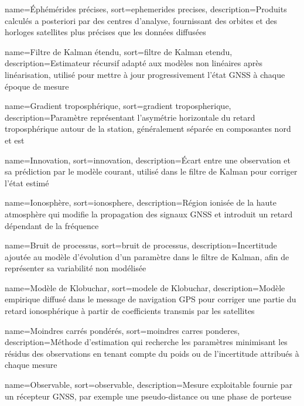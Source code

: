 {
    name={Éphémérides précises},
    sort={ephemerides precises},
    description={Produits calculés a posteriori par des centres d'analyse, fournissant des orbites et des horloges satellites plus précises que les données diffusées}
}

{
    name={Filtre de Kalman étendu},
    sort={filtre de Kalman etendu},
    description={Estimateur récursif adapté aux modèles non linéaires après linéarisation, utilisé pour mettre à jour progressivement l'état GNSS à chaque époque de mesure}
}

{
    name={Gradient troposphérique},
    sort={gradient tropospherique},
    description={Paramètre représentant l'asymétrie horizontale du retard troposphérique autour de la station, généralement séparée en composantes nord et est}
}

{
    name={Innovation},
    sort={innovation},
    description={Écart entre une observation et sa prédiction par le modèle courant, utilisé dans le filtre de Kalman pour corriger l'état estimé}
}

{
    name={Ionosphère},
    sort={ionosphere},
    description={Région ionisée de la haute atmosphère qui modifie la propagation des signaux GNSS et introduit un retard dépendant de la fréquence}
}

{
    name={Bruit de processus},
    sort={bruit de processus},
    description={Incertitude ajoutée au modèle d'évolution d'un paramètre dans le filtre de Kalman, afin de représenter sa variabilité non modélisée}
}

{
    name={Modèle de Klobuchar},
    sort={modele de Klobuchar},
    description={Modèle empirique diffusé dans le message de navigation GPS pour corriger une partie du retard ionosphérique à partir de coefficients transmis par les satellites}
}

{
    name={Moindres carrés pondérés},
    sort={moindres carres ponderes},
    description={Méthode d'estimation qui recherche les paramètres minimisant les résidus des observations en tenant compte du poids ou de l'incertitude attribués à chaque mesure}
}

{
    name={Observable},
    sort={observable},
    description={Mesure exploitable fournie par un récepteur GNSS, par exemple une pseudo-distance ou une phase de porteuse}
}

